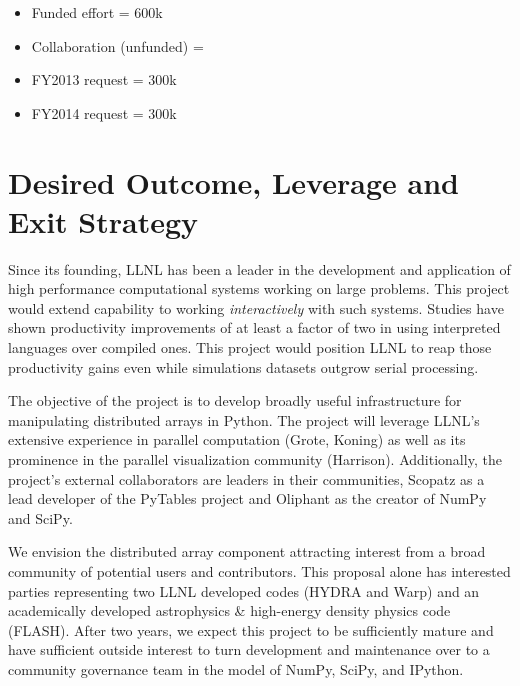 \documentclass[letterpaper,12pt]{article}
\begin{document}
\begin{itemize}
	\setlength{\itemsep}{0pt}
	\setlength{\parskip}{0pt}
	\setlength{\parsep}{0pt}

	\item Funded effort = 600k
	\item Collaboration (unfunded) =
	\item FY2013 request =  300k
	\item FY2014 request =  300k
\end{itemize}


\section*{Desired Outcome, Leverage and Exit Strategy}

Since its founding, LLNL has been a leader in the development and application of high 
performance computational systems working on large problems.  This project would extend 
capability to working \emph{interactively} with such systems.  Studies have shown productivity 
improvements of at least a factor of two\cite{Prechelt2000} in using interpreted languages 
over compiled ones.  This project would position LLNL to reap those productivity gains even 
while simulations datasets outgrow serial processing.

The objective of the project is to develop broadly useful infrastructure for manipulating 
distributed arrays in Python.  The project will leverage LLNL's extensive experience in 
parallel computation (Grote, Koning) as well as its prominence in the parallel visualization 
community (Harrison).  Additionally, the project's external collaborators are leaders in their 
communities, Scopatz as a lead developer of the PyTables project and Oliphant as the creator of 
NumPy and SciPy.

We envision the distributed array component attracting interest from a broad community 
of potential users and contributors.  This proposal alone has interested parties 
representing two LLNL developed codes (HYDRA and Warp) and an academically developed 
astrophysics \& high-energy density physics code (FLASH).  After two years, we expect this 
project to be sufficiently mature and have sufficient outside interest to turn development 
and maintenance over to a community governance team in the model of NumPy, SciPy, and IPython.

\end{document}
